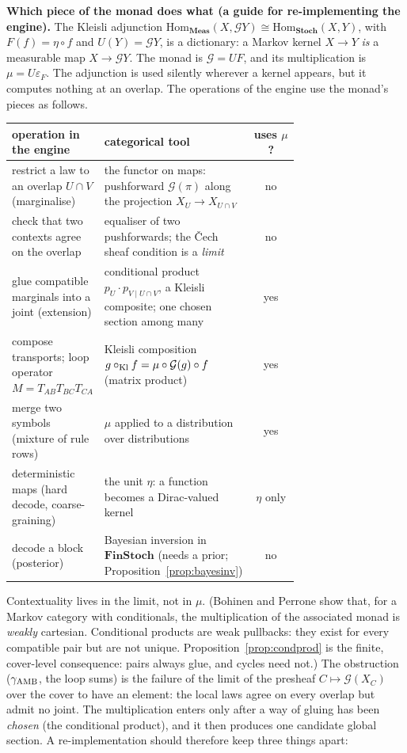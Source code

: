 \documentclass[11pt]{article}
\theoremstyle{definition}
\theoremstyle{remark}
\begin{document}
\textbf{Which piece of the monad does what (a guide for re-implementing the engine).} The Kleisli adjunction $\mathrm{Hom}_{\mathbf{Meas}}(X,\mathcal GY)\cong\mathrm{Hom}_{\mathbf{Stoch}}(X,Y)$, with $F(f)=\eta\circ f$ and $U(Y)=\mathcal GY$, is a dictionary: a Markov kernel $X\to Y$ \emph{is} a measurable map $X\to\mathcal GY$. The monad is $\mathcal G=UF$, and its multiplication is $\mu=U\varepsilon_F$. The adjunction is used silently wherever a kernel appears, but it computes nothing at an overlap. The operations of the engine use the monad's pieces as follows.
\begin{center}\small
\begin{tabular}{p{0.3\linewidth}p{0.42\linewidth}c}
\toprule
operation in the engine & categorical tool & uses $\mu$?\\
\midrule
restrict a law to an overlap $U\cap V$ (marginalise) & the functor on maps: pushforward $\mathcal G(\pi)$ along the projection $X_U\to X_{U\cap V}$ & no\\
check that two contexts agree on the overlap & equaliser of two pushforwards; the \v{C}ech sheaf condition is a \emph{limit} & no\\
glue compatible marginals into a joint (extension) & conditional product $p_U\cdot p_{V\mid U\cap V}$, a Kleisli composite; one chosen section among many & yes\\
compose transports; loop operator $M=T_{AB}T_{BC}T_{CA}$ & Kleisli composition $g\circ_{\rm Kl}f=\mu\circ\mathcal G(g)\circ f$ (matrix product) & yes\\
merge two symbols (mixture of rule rows) & $\mu$ applied to a distribution over distributions & yes\\
deterministic maps (hard decode, coarse-graining) & the unit $\eta$: a function becomes a Dirac-valued kernel & $\eta$ only\\
decode a block (posterior) & Bayesian inversion in $\mathbf{FinStoch}$ (needs a prior; Proposition~\ref{prop:bayesinv}) & no\\
\bottomrule
\end{tabular}
\end{center}
Contextuality lives in the limit, not in $\mu$. (Bohinen and Perrone \cite{bohinenperrone25} show that, for a Markov category with conditionals, the multiplication of the associated monad is \emph{weakly} cartesian. Conditional products are weak pullbacks: they exist for every compatible pair but are not unique. Proposition~\ref{prop:condprod} is the finite, cover-level consequence: pairs always glue, and cycles need not.) The obstruction ($\gamma_{\rm AMB}$, the loop sums) is the failure of the limit of the presheaf $C\mapsto\mathcal G(X_C)$ over the cover to have an element: the local laws agree on every overlap but admit no joint. The multiplication enters only after a way of gluing has been \emph{chosen} (the conditional product), and it then produces one candidate global section. A re-implementation should therefore keep three things apart:
\end{document}
